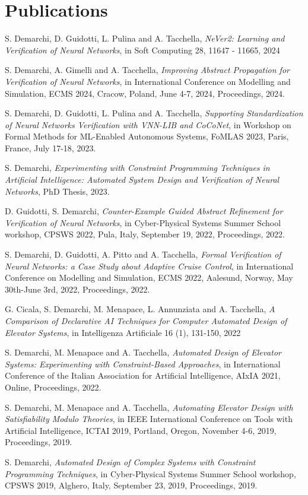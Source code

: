 \section{\sc Publications}

S. Demarchi, D. Guidotti, L. Pulina and A. Tacchella,
\textit{NeVer2: Learning and Verification of Neural Networks}, in Soft Computing 28, 11647 - 11665, 2024

S. Demarchi, A. Gimelli and A. Tacchella,
\textit{Improving Abstract Propagation for Verification of Neural
	Networks}, in International Conference on Modelling and
Simulation, ECMS 2024, Cracow, Poland, June 4-7, 2024,
Proceedings, 2024.

S. Demarchi, D. Guidotti, L. Pulina and A. Tacchella, 
\textit{Supporting Standardization of Neural Networks Verification
with VNN-LIB and CoCoNet}, in Workshop on Formal Methods for ML-Enabled 
Autonomous Systems, FoMLAS 2023, Paris, France, July 17-18, 2023.

S. Demarchi, \textit{Experimenting with Constraint Programming
	Techniques in Artificial Intelligence: Automated System Design
	and Verification of Neural Networks}, PhD Thesis, 2023.

D. Guidotti, S. Demarchi, \textit{Counter-Example Guided Abstract
	Refinement for Verification of Neural Networks}, in
Cyber-Physical Systems Summer School workshop, CPSWS 2022, Pula, 
Italy, September 19, 2022, Proceedings, 2022.


S. Demarchi, D. Guidotti, A. Pitto and A. Tacchella, \textit{Formal
	 Verification of Neural Networks: a Case Study about Adaptive 
	 Cruise Control}, in International Conference on Modelling and
Simulation, ECMS 2022, Aalesund, Norway, May 30th-June 3rd, 2022,
Proceedings, 2022.

G. Cicala, S. Demarchi, M. Menapace, L. Annunziata and A. Tacchella,
\textit{A Comparison of Declarative AI Techniques for Computer 
	Automated Design of Elevator Systems}, in Intelligenza Artificiale
16 (1), 131-150, 2022

S. Demarchi, M. Menapace and A. Tacchella, \textit{Automated Design 
	of Elevator Systems: Experimenting with Constraint-Based 
	Approaches}, in International Conference of the Italian 
Association for Artificial Intelligence, AIxIA 2021, Online,
Proceedings, 2022.

S. Demarchi, M. Menapace and A. Tacchella, \textit{Automating Elevator 
	Design with Satisfiability Modulo Theories}, in IEEE International 
Conference on Tools with Artificial Intelligence, ICTAI 2019, Portland, 
Oregon, November 4-6, 2019, Proceedings, 2019.

S. Demarchi, \textit{Automated Design of Complex Systems with Constraint 
	Programming Techniques}, in Cyber-Physical Systems Summer School 
workshop, CPSWS 2019, Alghero, Italy, September 23, 2019, Proceedings, 
2019.